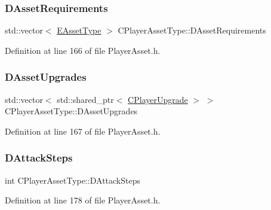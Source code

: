 \subsubsection{\texorpdfstring{D\+Asset\+Requirements}{DAssetRequirements}}
{\footnotesize\ttfamily std\+::vector$<$ \hyperlink{GameDataTypes_8h_a5600d4fc433b83300308921974477fec}{E\+Asset\+Type} $>$ C\+Player\+Asset\+Type\+::\+D\+Asset\+Requirements\hspace{0.3cm}{\ttfamily [protected]}}



Definition at line 166 of file Player\+Asset.\+h.

\hypertarget{classCPlayerAssetType_aeb8d5c3ea81ea56248d02a5e24d48001}{}\label{classCPlayerAssetType_aeb8d5c3ea81ea56248d02a5e24d48001} 
\subsubsection{\texorpdfstring{D\+Asset\+Upgrades}{DAssetUpgrades}}
{\footnotesize\ttfamily std\+::vector$<$ std\+::shared\+\_\+ptr$<$ \hyperlink{classCPlayerUpgrade}{C\+Player\+Upgrade} $>$ $>$ C\+Player\+Asset\+Type\+::\+D\+Asset\+Upgrades\hspace{0.3cm}{\ttfamily [protected]}}



Definition at line 167 of file Player\+Asset.\+h.

\hypertarget{classCPlayerAssetType_af2a95fbee4ed2ac1ff1da0f649966a6d}{}\label{classCPlayerAssetType_af2a95fbee4ed2ac1ff1da0f649966a6d} 
\subsubsection{\texorpdfstring{D\+Attack\+Steps}{DAttackSteps}}
{\footnotesize\ttfamily int C\+Player\+Asset\+Type\+::\+D\+Attack\+Steps\hspace{0.3cm}{\ttfamily [protected]}}



Definition at line 178 of file Player\+Asset.\+h.

\hypertarget{classCPlayerAssetType_ade46bb31e24e01ba4b523bdf67472d59}{}\label{classCPlayerAssetType_ade46bb31e24e01ba4b523bdf67472d59} 
